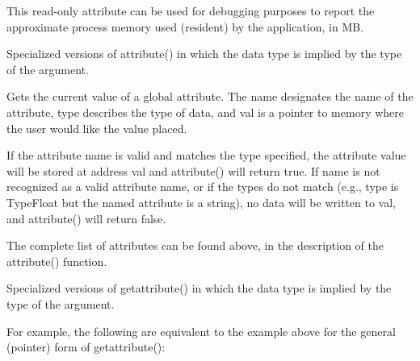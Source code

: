 \vspace{10pt}
\NEW %
This read-only attribute can be used for debugging purposes to report
the approximate process memory used (resident) by the application, in MB.
\apiend

\apiend


Specialized versions of {\cf attribute()} in which the data type is
implied by the type of the argument.
\apiend




Gets the current value of a global attribute.  The {\cf name} designates
the name of the attribute, {\cf type} describes the type of data, and
{\cf val} is a pointer to memory where the user would like the value
placed.

If the attribute name is valid and matches the type specified, the
attribute value will be stored at address {\cf val} and {\cf
  attribute()} will return {\cf true}.  If {\cf name} is not recognized
as a valid attribute name, or if the types do not match (e.g., {\cf
  type} is {\cf TypeFloat} but the named attribute is a
string), no data will be written to {\cf val}, and {\cf attribute()}
will return {\cf false}.

The complete list of attributes can be found above, in the description
of the {\cf attribute()} function.
\apiend

Specialized versions of {\cf getattribute()} in which the data type is
implied by the type of the argument.

For example, the following are equivalent to the example above for the
general (pointer) form of {\cf getattribute()}:

